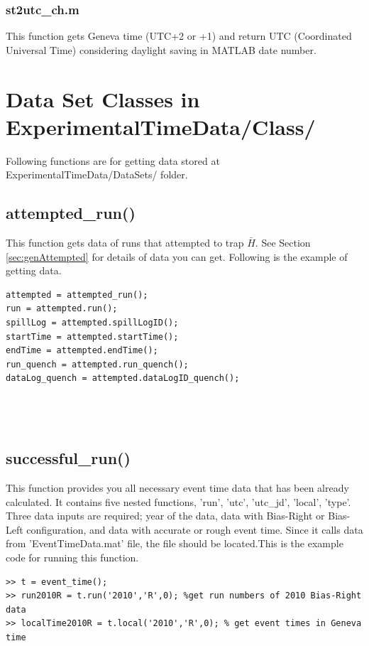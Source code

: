\documentclass[12pt]{report}
\begin{document}

\subsection{st2utc\_ch.m}
This function gets Geneva time (UTC+2 or +1) and return UTC (Coordinated Universal Time) considering daylight saving in MATLAB date number.




\chapter{Data Set Classes in ExperimentalTimeData/Class/}
Following functions are for getting data stored at ExperimentalTimeData/DataSets/ folder. 

\section{attempted\_run()}
\label{sec:attempted}
This function gets data of runs that attempted to trap $\bar{H}$. See Section \ref{sec:genAttempted} for details of data you can get. Following is the example of getting data.

\begin{verbatim}
attempted = attempted_run();
run = attempted.run();
spillLog = attempted.spillLogID();
startTime = attempted.startTime();
endTime = attempted.endTime();
run_quench = attempted.run_quench();
dataLog_quench = attempted.dataLogID_quench();




\end{verbatim}

\section{successful\_run()}
\label{sec:successful}


This function provides you all necessary event time data that has been already calculated. It contains five nested functions, 'run', 'utc', 'utc\_jd', 'local', 'type'. Three data inputs are required; year of the data, data with Bias-Right or Bias-Left configuration, and data with accurate or rough event time. Since it calls data from 'EventTimeData.mat' file, the file should be located.This is the example code for running this function.\\
\begin{verbatim}
>> t = event_time();
>> run2010R = t.run('2010','R',0); %get run numbers of 2010 Bias-Right data
>> localTime2010R = t.local('2010','R',0); % get event times in Geneva time
\end{verbatim}
\end{document}
